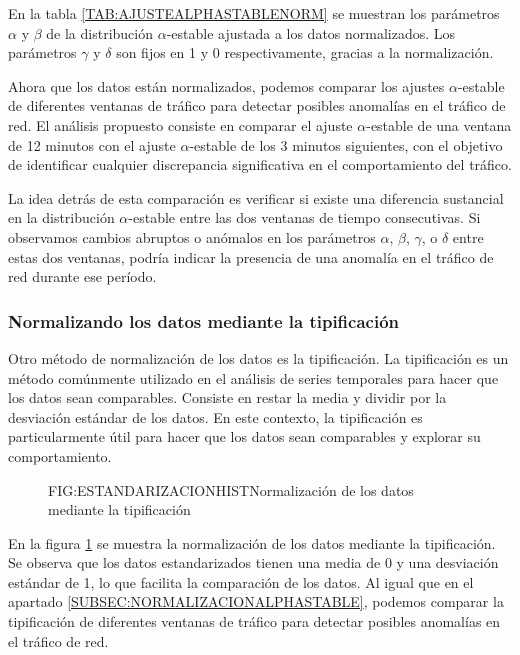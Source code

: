En la tabla \ref{TAB:AJUSTEALPHASTABLENORM} se muestran los parámetros $\alpha$ y $\beta$ de la distribución $\alpha$-estable ajustada a los datos normalizados. Los parámetros $\gamma$ y $\delta$ son fijos en 1 y 0 respectivamente, gracias a la normalización.

Ahora que los datos están normalizados, podemos comparar los ajustes $\alpha$-estable de diferentes ventanas de tráfico para detectar posibles anomalías en el tráfico de red. El análisis propuesto consiste en comparar el ajuste $\alpha$-estable de una ventana de 12 minutos con el ajuste $\alpha$-estable de los 3 minutos siguientes, con el objetivo de identificar cualquier discrepancia significativa en el comportamiento del tráfico.

La idea detrás de esta comparación es verificar si existe una diferencia sustancial en la distribución $\alpha$-estable entre las dos ventanas de tiempo consecutivas. Si observamos cambios abruptos o anómalos en los parámetros $\alpha$, $\beta$, $\gamma$, o $\delta$ entre estas dos ventanas, podría indicar la presencia de una anomalía en el tráfico de red durante ese período.

\subsubsection{Normalizando los datos mediante la tipificación}

Otro método de normalización de los datos es la tipificación. La tipificación es un método comúnmente utilizado en el análisis de series temporales para hacer que los datos sean comparables. Consiste en restar la media y dividir por la desviación estándar de los datos. En este contexto, la tipificación es particularmente útil para hacer que los datos sean comparables y explorar su comportamiento.

\begin{figure}[Normalización de los datos mediante la tipificación]{FIG:ESTANDARIZACIONHIST}{Normalización de los datos mediante la tipificación}
    \label{FIG:ESTANDARIZACIONHIST}
\end{figure}

En la figura \ref{FIG:ESTANDARIZACIONHIST} se muestra la normalización de los datos mediante la tipificación. Se observa que los datos estandarizados tienen una media de 0 y una desviación estándar de 1, lo que facilita la comparación de los datos. 
Al igual que en el apartado \ref{SUBSEC:NORMALIZACIONALPHASTABLE}, podemos comparar la tipificación de diferentes ventanas de tráfico para detectar posibles anomalías en el tráfico de red. 

